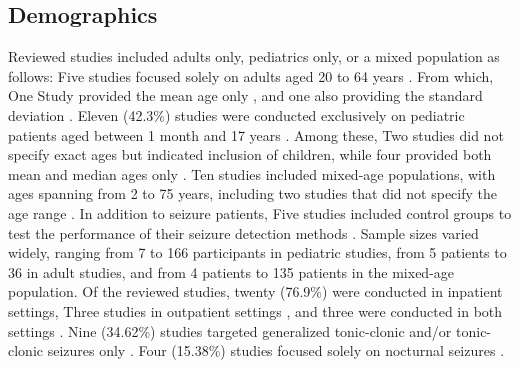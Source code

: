 \subsection{Demographics}

Reviewed studies included adults only, pediatrics only, or a mixed population as follows: Five studies \cite{Cogan2017-lg, Hamlin2021-sd, Chowdhury2022-bi, Vakilna2024-hk, Ali2020-ke} focused solely on adults aged 20 \cite{Chowdhury2022-bi} to 64 years \cite{Cogan2017-lg} . From which, One Study provided the mean age only \cite{Hamlin2021-sd}, and one also providing the standard deviation \cite{Vakilna2024-hk}. Eleven (42.3\%) studies \cite{Yu2023-ss, Milosevic2016-ee, Hegarty-Craver2021-hk, De_Cooman2018-pq, Poh2012-af, Wu2024-yl, Gheryani2017-yg, Ge2023-ab, Wang2025-ql, Jiang2022-zu, Tang2021-td} were conducted exclusively on pediatric patients aged between 1 month \cite{Jiang2022-zu} and 17 years \cite{Hegarty-Craver2021-hk}. Among these, Two studies \cite{Milosevic2016-ee, De_Cooman2018-pq} did not specify exact ages but indicated inclusion of children, while four provided both mean and median ages only \cite{Yu2023-ss, Poh2012-af, Ge2023-ab, Tang2021-td}. Ten studies \cite{Van_Andel2017-yx, Wang2022-lt, Regalia2019-ch, Nasseri2021-xn, Arends2018-ew, Larsen2024-vn, Dong2022-oo, Li2022-ty, Xu2022-tx, Wang2025-my} included mixed-age populations, with ages spanning from 2 \cite{Van_Andel2017-yx} to 75 years\cite{Larsen2024-vn}, including two studies that did not specify the age range \cite{Nasseri2021-xn, Xu2022-tx}. In addition to seizure patients, Five studies included control groups to test the performance of their seizure detection methods \cite{Van_Andel2017-yx, Wang2022-lt, Vakilna2024-hk, Larsen2024-vn, Wang2025-my}. Sample sizes varied widely, ranging from 7 \cite{De_Cooman2018-pq} to 166 participants \cite{Yu2023-ss} in pediatric studies, from 5 patients \cite{Ali2020-ke} to 36 \cite{Vakilna2024-hk} in adult studies, and from 4 patients \cite{Li2022-ty} to 135 patients \cite{Regalia2019-ch} in the mixed-age population. Of the reviewed studies, twenty (76.9\%) were conducted in inpatient settings, Three studies in outpatient settings \cite{Wang2022-lt, Chowdhury2022-bi, Dong2022-oo}, and three were conducted in both settings \cite{Regalia2019-ch, Nasseri2021-xn, Wang2025-my}. Nine (34.62\%) studies targeted generalized tonic-clonic and/or tonic-clonic seizures only \cite{Milosevic2016-ee, Wang2022-lt, De_Cooman2018-pq, Poh2012-af, Vakilna2024-hk, Larsen2024-vn, Li2022-ty, Xu2022-tx, Wang2025-my}. Four (15.38\%) studies focused solely on nocturnal seizures \cite{Van_Andel2017-yx, De_Cooman2018-pq, Gheryani2017-yg, Larsen2024-vn}.